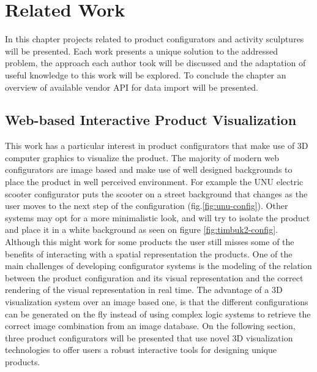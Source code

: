 \documentclass[../medieninformatik-arbeit.tex]{subfiles}
\begin{document}
	

\section{Related Work}
\label{ch:related}
In this chapter projects related to product configurators and activity
sculptures will be presented. Each work presents a unique solution to the addressed problem, 
the approach each author took will be discussed and the adaptation of useful knowledge to this
work will be explored. To conclude the chapter an overview of available vendor
API for data import will be presented. 

\subsection{Web-based Interactive Product Visualization}
This work has a particular interest in product configurators that make use of 3D
computer graphics to visualize the product. The majority of modern web
configurators are image based and make use of well designed backgrounds to place the
product in well perceived environment. For example the UNU electric scooter
configurator puts the scooter on a street background that
changes as the user moves to the next step of the configuration (fig.\ref{fig:unu-config}). 
Other systems may opt for a more minimalistic look, and will try to isolate the
product and place it in a white background as seen on
figure \ref{fig:timbuk2-config}. 
Although this might work for some products the user still misses some of the benefits of
interacting with a spatial representation the products\cite{vande2009analyzing}.
One of the main challenges of developing  configurator systems is the modeling
of the relation between the product configuration and its visual representation
and the correct rendering of the visual representation in real
time\cite{feliceinteractive}. The advantage of a 3D visualization system
over an image based one, is that the different configurations can be generated on
the fly instead of using complex logic systems to retrieve the correct image
combination from an image database. On the following section, three product
configurators will be presented that use novel 3D visualization technologies to
offer users a robust interactive tools for designing unique products.
\end{document}
